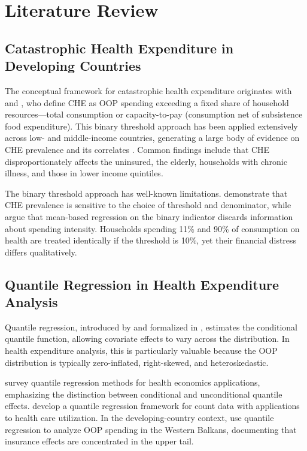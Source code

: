 \section{Literature Review}\label{sec:literature}

\subsection{Catastrophic Health Expenditure in Developing Countries}

The conceptual framework for catastrophic health expenditure originates with \citet{Wagstaff2003} and \citet{Xu2003}, who define CHE as OOP spending exceeding a fixed share of household resources---total consumption or capacity-to-pay (consumption net of subsistence food expenditure). This binary threshold approach has been applied extensively across low- and middle-income countries, generating a large body of evidence on CHE prevalence and its correlates \citep{Wagstaff2008, WHO2019}. Common findings include that CHE disproportionately affects the uninsured, the elderly, households with chronic illness, and those in lower income quintiles.

The binary threshold approach has well-known limitations. \citet{Flores2008} demonstrate that CHE prevalence is sensitive to the choice of threshold and denominator, while \citet{Moreno2011} argue that mean-based regression on the binary indicator discards information about spending intensity. Households spending 11\% and 90\% of consumption on health are treated identically if the threshold is 10\%, yet their financial distress differs qualitatively.

\subsection{Quantile Regression in Health Expenditure Analysis}

Quantile regression, introduced by \citet{Koenker1978} and formalized in \citet{Koenker2005}, estimates the conditional quantile function, allowing covariate effects to vary across the distribution. In health expenditure analysis, this is particularly valuable because the OOP distribution is typically zero-inflated, right-skewed, and heteroskedastic.

\citet{Jones2013} survey quantile regression methods for health economics applications, emphasizing the distinction between conditional and unconditional quantile effects. \citet{Machado2019} develop a quantile regression framework for count data with applications to health care utilization. In the developing-country context, \citet{Bredenkamp2011} use quantile regression to analyze OOP spending in the Western Balkans, documenting that insurance effects are concentrated in the upper tail.

